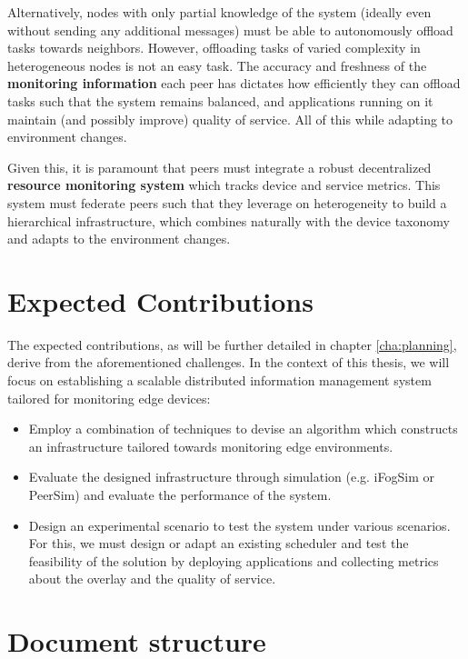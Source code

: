 Alternatively, nodes with only partial knowledge of the system (ideally even without sending any additional messages) must be able to autonomously offload tasks towards neighbors. However, offloading tasks of varied complexity in heterogeneous nodes is not an easy task. The accuracy and freshness of the \textbf{monitoring information} each peer has dictates how efficiently they can offload tasks such that the system remains balanced, and applications running on it maintain (and possibly improve) quality of service. All of this while adapting to environment changes. 

Given this, it is paramount that peers must integrate a robust decentralized \textbf{resource monitoring system} which tracks device and service metrics. This system must federate peers such that they leverage on heterogeneity to build a hierarchical infrastructure, which combines naturally with the device taxonomy and adapts to the environment changes. 

\section{Expected Contributions}

The expected contributions, as will be further detailed in chapter \ref{cha:planning}, derive from the aforementioned challenges. In the context of this thesis, we will focus on establishing a scalable distributed information management system tailored for monitoring edge devices:

\begin{itemize}

    \item Employ a combination of techniques to devise an algorithm which constructs an infrastructure tailored towards monitoring edge environments.
    
    \item Evaluate the designed infrastructure through simulation (e.g. iFogSim or PeerSim) and evaluate the performance of the system.

    \item Design an experimental scenario to test the system under various scenarios. For this, we must design or adapt an existing scheduler and test the feasibility of the solution by deploying applications and collecting metrics about the overlay and the quality of service.
    
\end{itemize}

\section{Document structure}

